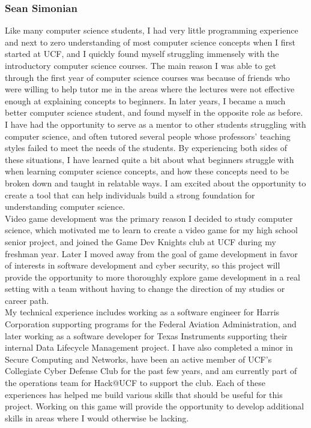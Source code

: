 \subsubsection{Sean Simonian}
Like many computer science students, I had very little programming experience
and next to zero understanding of most computer science concepts when I first
started at UCF, and I quickly found myself struggling immensely with the
introductory computer science courses. The main reason I was able to get through
the first year of computer science courses was because of friends who were
willing to help tutor me in the areas where the lectures were not effective
enough at explaining concepts to beginners. In later years, I became a much
better computer science student, and found myself in the opposite role as
before. I have had the opportunity to serve as a mentor to other students
struggling with computer science, and often tutored several people whose
professors’ teaching styles failed to meet the needs of the students. By
experiencing both sides of these situations, I have learned quite a bit about
what beginners struggle with when learning computer science concepts, and how
these concepts need to be broken down and taught in relatable ways. I am excited
about the opportunity to create a tool that can help individuals build a strong
foundation for understanding computer science.\\

Video game development was the primary reason I decided to study computer
science, which motivated me to learn to create a video game for my high school
senior project, and joined the Game Dev Knights club at UCF during my freshman
year. Later I moved away from the goal of game development in favor of interests
in software development and cyber security, so this project will provide the
opportunity to more thoroughly explore game development in a real setting with a
team without having to change the direction of my studies or career path.\\

My technical experience includes working as a software engineer for Harris
Corporation supporting programs for the Federal Aviation Administration, and
later working as a software developer for Texas Instruments supporting their
internal Data Lifecycle Management project. I have also completed a minor in
Secure Computing and Networks, have been an active member of UCF’s Collegiate
Cyber Defense Club for the past few years, and am currently part of the
operations team for Hack@UCF to support the club. Each of these experiences has
helped me build various skills that should be useful for this project. Working
on this game will provide the opportunity to develop additional skills in areas
where I would otherwise be lacking.

